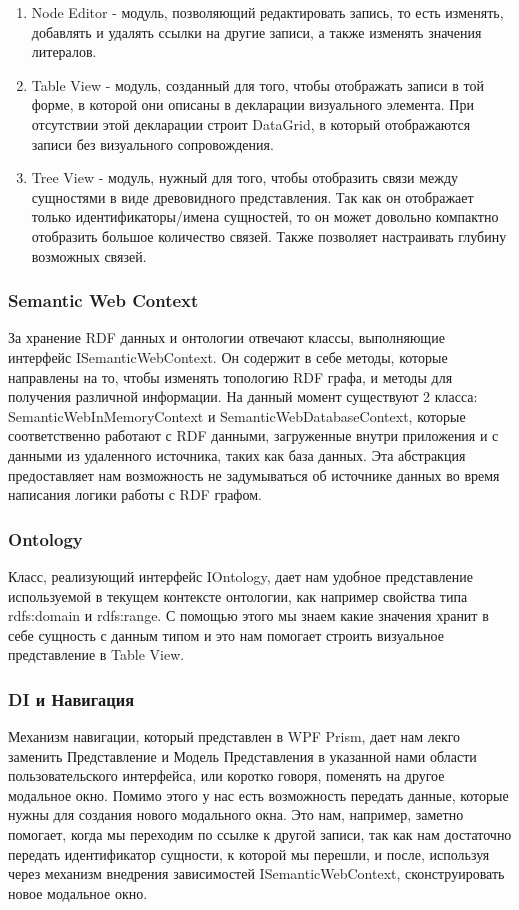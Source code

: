 \documentclass[12pt]{article}
\begin{document}
\begin{enumerate}
    \item Node Editor - модуль, позволяющий редактировать запись, то есть изменять, добавлять и удалять ссылки на другие записи, а также изменять значения литералов.
    \item Table View - модуль, созданный для того, чтобы отображать записи в той форме, в которой они описаны в декларации визуального элемента. При отсутствии этой декларации строит DataGrid, в который отображаются записи без визуального сопровождения.
    \item Tree View - модуль, нужный для того, чтобы отобразить связи между сущностями в виде древовидного представления. Так как он отображает только идентификаторы/имена сущностей, то он может довольно компактно отобразить большое количество связей. Также позволяет настраивать глубину возможных связей.
\end{enumerate}

\subsubsection{Semantic Web Context}
\qquad За хранение RDF данных и онтологии отвечают классы, выполняющие интерфейс ISemanticWebContext. Он содержит в себе методы, которые направлены на то, чтобы изменять топологию RDF графа, и методы для получения различной информации. На данный момент существуют 2 класса: SemanticWebInMemoryContext и SemanticWebDatabaseContext, которые соответственно работают с RDF данными, загруженные внутри приложения и с данными из удаленного источника, таких как база данных. Эта абстракция предоставляет нам возможность не задумываться об источнике данных во время написания логики работы с RDF графом.

\subsubsection{Ontology}
\qquad Класс, реализующий интерфейс IOntology, дает нам удобное представление используемой в текущем контексте онтологии, как например свойства типа rdfs:domain и rdfs:range. С помощью этого мы знаем какие значения хранит в себе сущность с данным типом и это нам помогает строить визуальное представление в Table View.

\subsubsection{DI и Навигация}
Механизм навигации, который представлен в WPF Prism, дает нам лекго заменить Представление и Модель Представления в указанной нами области пользовательского интерфейса, или коротко говоря, поменять на другое модальное окно. Помимо этого у нас есть возможность передать данные, которые нужны для создания нового модального окна. Это нам, например, заметно помогает, когда мы переходим по ссылке к другой записи, так как нам достаточно передать идентификатор сущности, к которой мы перешли, и после, используя через механизм внедрения зависимостей ISemanticWebContext, сконструировать новое модальное окно.
\end{document}

